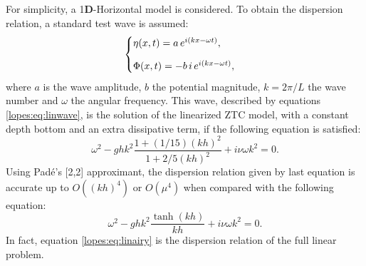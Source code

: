 For simplicity,  a 1{\bf D}-Horizontal  model is  considered.
To obtain the dispersion relation,
a standard  test  wave is assumed:
\begin{equation}\label{lopes:eq:linwave}
\begin{cases}
\eta(x,t)=a\,e^{i(kx-\omega t)},\vspace{0.3cm}\\
\Phi(x,t)=-b\,i\,e^{i(kx-\omega t)},
\end{cases}
\end{equation}
where \(a\) is the wave amplitude,  \(b\) the potential
magnitude, \(k=2\pi/L\) the wave number and \(\omega\) the angular frequency.
This wave, described by equations \eqref{lopes:eq:linwave}, is the
solution of the linearized  ZTC model, with a constant depth
bottom and an extra dissipative term,
 if the following equation is satisfied:
\begin{equation}\label{lopes:eq:dissdisp}
\omega^2-ghk^2\frac{1+(1/15)(kh)^2}{1+2/5(kh)^2}+i\nu\omega k^2=0.
\end{equation}
Using Pad\'{e}'s [2,2] approximant,  the dispersion relation
given by last equation  is accurate up to \(O((kh)^4)\) or \(O(\mu^4)\) when
compared with the following equation:
\begin{equation}\label{lopes:eq:linairy}
\omega^2-ghk^2\frac{\tanh(kh)}{kh}+i\nu\omega k^2=0.
\end{equation}
In  fact, equation \eqref{lopes:eq:linairy} is the dispersion
relation of the full linear problem.

